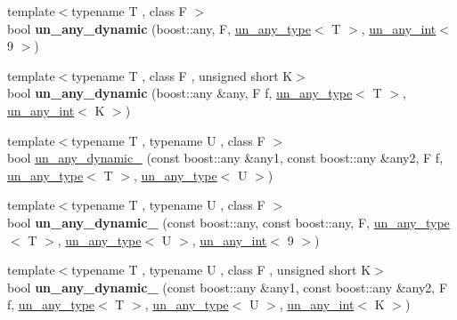 \begin{DoxyCompactItemize}
\item 
\mbox{\label{group__boost__any__stuff_ga3d9ded51a5ab0d86bf827736a5050619}} 
{\footnotesize template$<$typename T , class F $>$ }\\bool {\bfseries un\+\_\+any\+\_\+dynamic} (boost\+::any, F, \mbox{\hyperlink{struct_s_m_spp__di__unipi__it_1_1un__any__type}{un\+\_\+any\+\_\+type}}$<$ T $>$, \mbox{\hyperlink{struct_s_m_spp__di__unipi__it_1_1un__any__int}{un\+\_\+any\+\_\+int}}$<$ 9 $>$)
\item 
\mbox{\label{group__boost__any__stuff_ga14a0bea1e81f11c0cec070e88a5880a8}} 
{\footnotesize template$<$typename T , class F , unsigned short K$>$ }\\bool {\bfseries un\+\_\+any\+\_\+dynamic} (boost\+::any \&any, F f, \mbox{\hyperlink{struct_s_m_spp__di__unipi__it_1_1un__any__type}{un\+\_\+any\+\_\+type}}$<$ T $>$, \mbox{\hyperlink{struct_s_m_spp__di__unipi__it_1_1un__any__int}{un\+\_\+any\+\_\+int}}$<$ K $>$)
\item 
{\footnotesize template$<$typename T , typename U , class F $>$ }\\bool \mbox{\hyperlink{group__boost__any__stuff_gadaf95dbdadd3727f00ee8f2bcdbf29cf}{un\+\_\+any\+\_\+dynamic\+\_}} (const boost\+::any \&any1, const boost\+::any \&any2, F f, \mbox{\hyperlink{struct_s_m_spp__di__unipi__it_1_1un__any__type}{un\+\_\+any\+\_\+type}}$<$ T $>$, \mbox{\hyperlink{struct_s_m_spp__di__unipi__it_1_1un__any__type}{un\+\_\+any\+\_\+type}}$<$ U $>$)
\item 
\mbox{\label{group__boost__any__stuff_gabaf383d2962957e55a5f2f660c778ec4}} 
{\footnotesize template$<$typename T , typename U , class F $>$ }\\bool {\bfseries un\+\_\+any\+\_\+dynamic\+\_} (const boost\+::any, const boost\+::any, F, \mbox{\hyperlink{struct_s_m_spp__di__unipi__it_1_1un__any__type}{un\+\_\+any\+\_\+type}}$<$ T $>$, \mbox{\hyperlink{struct_s_m_spp__di__unipi__it_1_1un__any__type}{un\+\_\+any\+\_\+type}}$<$ U $>$, \mbox{\hyperlink{struct_s_m_spp__di__unipi__it_1_1un__any__int}{un\+\_\+any\+\_\+int}}$<$ 9 $>$)
\item 
\mbox{\label{group__boost__any__stuff_gae46ac12664e72c590768843404c8561a}} 
{\footnotesize template$<$typename T , typename U , class F , unsigned short K$>$ }\\bool {\bfseries un\+\_\+any\+\_\+dynamic\+\_} (const boost\+::any \&any1, const boost\+::any \&any2, F f, \mbox{\hyperlink{struct_s_m_spp__di__unipi__it_1_1un__any__type}{un\+\_\+any\+\_\+type}}$<$ T $>$, \mbox{\hyperlink{struct_s_m_spp__di__unipi__it_1_1un__any__type}{un\+\_\+any\+\_\+type}}$<$ U $>$, \mbox{\hyperlink{struct_s_m_spp__di__unipi__it_1_1un__any__int}{un\+\_\+any\+\_\+int}}$<$ K $>$)

\end{DoxyCompactItemize}
